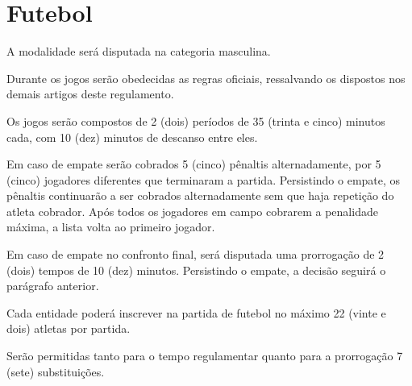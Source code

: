 {\let\clearpage\relax \chapter{Futebol}}

\begin{article}
	A modalidade será disputada na categoria masculina.
\end{article}

\begin{article}
	Durante os jogos serão obedecidas as regras oficiais, ressalvando os dispostos nos demais artigos deste regulamento.
\end{article}

\begin{article}
	Os jogos serão compostos de 2 (dois) períodos de 35 (trinta e cinco) minutos cada, com 10 (dez) minutos de descanso entre eles.

	\begin{xparagraph}
		Em caso de empate serão cobrados 5 (cinco) pênaltis alternadamente, por 5 (cinco) jogadores diferentes que terminaram a partida. Persistindo o empate, os pênaltis continuarão a ser cobrados alternadamente sem que haja repetição do atleta cobrador. Após todos os jogadores em campo cobrarem a penalidade máxima, a lista volta ao primeiro jogador.
	\end{xparagraph}

	\begin{xparagraph}
		Em caso de empate no confronto final, será disputada uma prorrogação de 2 (dois) tempos de 10 (dez) minutos. Persistindo o empate, a decisão seguirá o parágrafo anterior.
	\end{xparagraph}
\end{article}

\begin{article}
	Cada entidade poderá inscrever na partida de futebol no máximo 22 (vinte e dois) atletas por partida.
\end{article}

\begin{article}
	Serão permitidas tanto para o tempo regulamentar quanto para a prorrogação 7 (sete) substituições.
\end{article}
